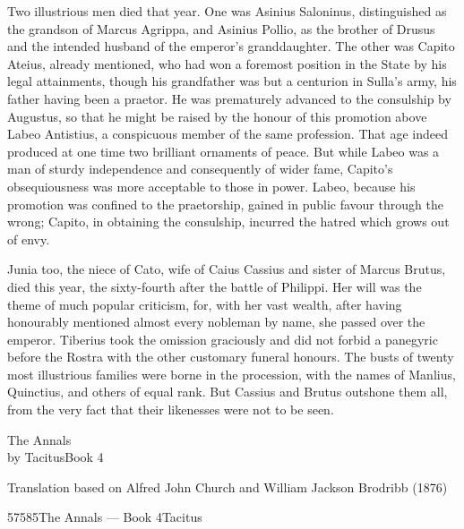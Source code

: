 
Two illustrious men died that year. One was Asinius Saloninus, distinguished as the grandson of Marcus Agrippa, and Asinius Pollio, as the brother of Drusus and the intended husband of the emperor's granddaughter. The other was Capito Ateius, already mentioned, who had won a foremost position in the State by his legal attainments, though his grandfather was but a centurion in Sulla's army, his father having been a praetor. He was prematurely advanced to the consulship by Augustus, so that he might be raised by the honour of this promotion above Labeo Antistius, a conspicuous member of the same profession. That age indeed produced at one time two brilliant ornaments of peace. But while Labeo was a man of sturdy independence and consequently of wider fame, Capito's obsequiousness was more acceptable to those in power. Labeo, because his promotion was confined to the praetorship, gained in public favour through the wrong; Capito, in obtaining the consulship, incurred the hatred which grows out of envy.


Junia too, the niece of Cato, wife of Caius Cassius and sister of Marcus Brutus, died this year, the sixty-fourth after the battle of Philippi. Her will was the theme of much popular criticism, for, with her vast wealth, after having honourably mentioned almost every nobleman by name, she passed over the emperor. Tiberius took the omission graciously and did not forbid a panegyric before the Rostra with the other customary funeral honours. The busts of twenty most illustrious families were borne in the procession, with the names of Manlius, Quinctius, and others of equal rank. But Cassius and Brutus outshone them all, from the very fact that their likenesses were not to be seen.


The Annals\\
by TacitusBook 4

Translation based on Alfred John Church and William Jackson Brodribb (1876)

57585The Annals — Book 4Tacitus


